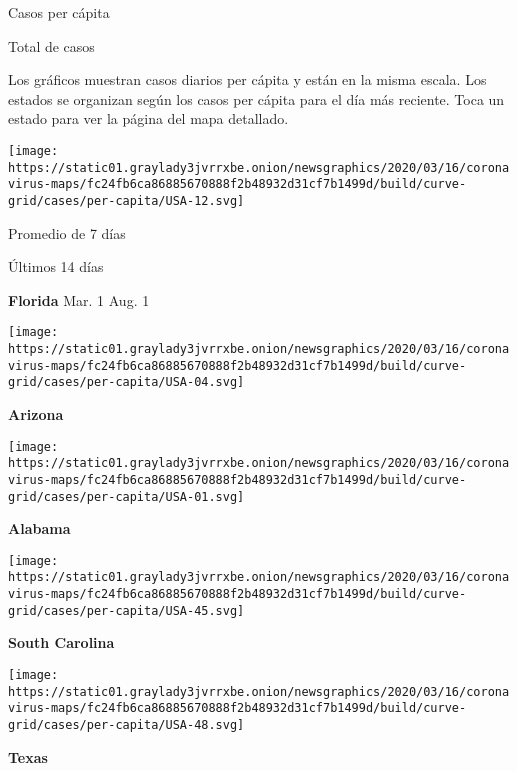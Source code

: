 Casos per cápita

Total de casos

Los gráficos muestran casos diarios per cápita y están en la misma
escala. Los estados se organizan según los casos per cápita para el día
más reciente. Toca un estado para ver la página del mapa detallado.

\href{https://www.nytimes3xbfgragh.onion/interactive/2020/us/florida-coronavirus-cases.html}{}

\texttt{[image: https://static01.graylady3jvrrxbe.onion/newsgraphics/2020/03/16/coronavirus-maps/fc24fb6ca86885670888f2b48932d31cf7b1499d/build/curve-grid/cases/per-capita/USA-12.svg]}

Promedio de 7 días

Últimos 14 días

\textbf{Florida} Mar. 1 Aug. 1

\href{https://www.nytimes3xbfgragh.onion/interactive/2020/us/arizona-coronavirus-cases.html}{}

\texttt{[image: https://static01.graylady3jvrrxbe.onion/newsgraphics/2020/03/16/coronavirus-maps/fc24fb6ca86885670888f2b48932d31cf7b1499d/build/curve-grid/cases/per-capita/USA-04.svg]}

\textbf{Arizona}

\href{https://www.nytimes3xbfgragh.onion/interactive/2020/us/alabama-coronavirus-cases.html}{}

\texttt{[image: https://static01.graylady3jvrrxbe.onion/newsgraphics/2020/03/16/coronavirus-maps/fc24fb6ca86885670888f2b48932d31cf7b1499d/build/curve-grid/cases/per-capita/USA-01.svg]}

\textbf{Alabama}

\href{https://www.nytimes3xbfgragh.onion/interactive/2020/us/south-carolina-coronavirus-cases.html}{}

\texttt{[image: https://static01.graylady3jvrrxbe.onion/newsgraphics/2020/03/16/coronavirus-maps/fc24fb6ca86885670888f2b48932d31cf7b1499d/build/curve-grid/cases/per-capita/USA-45.svg]}

\textbf{South Carolina}

\href{https://www.nytimes3xbfgragh.onion/interactive/2020/us/texas-coronavirus-cases.html}{}

\texttt{[image: https://static01.graylady3jvrrxbe.onion/newsgraphics/2020/03/16/coronavirus-maps/fc24fb6ca86885670888f2b48932d31cf7b1499d/build/curve-grid/cases/per-capita/USA-48.svg]}

\textbf{Texas}

